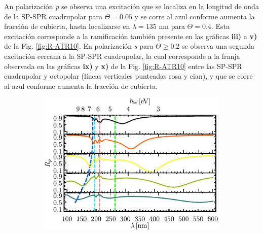 An polarización \emph{p} se observa una excitación que se localiza en la longitud de onda de la SP-SPR cuadrupolar para $\Theta=0.05$ y se corre al azul conforme aumenta la fracción de cubierta, hasta localizarse en $\lambda= 135$ nm para $\Theta=0.4$. Esta excitación corresponde a la ramificación también presente en las gráficas \textbf{iii)} a \textbf{v)} de la Fig. \ref{fig:R-ATR10}. En polarización \emph{s} para $\Theta\geq 0.2$ se observa una segunda excitación cercana a la SP-SPR cuadrupolar, la cual corresponde a la franja observada en las gráficas \textbf{ix)} y \textbf{x)} de la Fig. \ref{fig:R-ATR10} entre las SP-SPR cuadrupolar y octopolar (líneas verticales punteadas rosa y cian), y que se corre al azul conforme aumenta la fracción de cubierta.


\begin{figure}[h!]\centering\hspace*{-1.5em}
	\begin{subfigure}{.01\linewidth}\caption{}\label{sfig:R-ATR10-cutp}\vspace{4.5cm}\end{subfigure}
	\begin{subfigure}{.45\linewidth}\hspace*{-1.5em}
	\includegraphics[scale=1]{2-Resultados/figs/2-Wp10ThetaVar/cut_angle_65_p_Stack.pdf}\end{subfigure}
	\begin{subfigure}{.01\linewidth}\caption{}\label{sfig:R-ATR10-cuts}\vspace{4.5cm}\end{subfigure}\hspace*{-1.em}
	\begin{subfigure}{.45\linewidth}\centering

\end{subfigure}
\end{figure}
